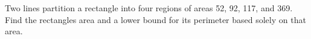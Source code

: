 Two lines partition a rectangle into four regions of areas 52, 92, 117, and 369. Find the rectangle\textquotesingle s area and a lower bound for its perimeter based solely on that area.
